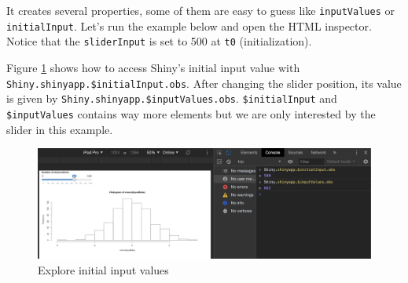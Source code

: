 \documentclass[]{book}
\newenvironment{Shaded}{\begin{snugshade}}{\end{snugshade}}
\newcommand{\ControlFlowTok}[1]{\textcolor[rgb]{0.13,0.29,0.53}{\textbf{#1}}}
\newcommand{\DataTypeTok}[1]{\textcolor[rgb]{0.13,0.29,0.53}{#1}}
\newcommand{\DecValTok}[1]{\textcolor[rgb]{0.00,0.00,0.81}{#1}}
\newcommand{\KeywordTok}[1]{\textcolor[rgb]{0.13,0.29,0.53}{\textbf{#1}}}
\newcommand{\NormalTok}[1]{#1}
\newcommand{\OperatorTok}[1]{\textcolor[rgb]{0.81,0.36,0.00}{\textbf{#1}}}
\newcommand{\StringTok}[1]{\textcolor[rgb]{0.31,0.60,0.02}{#1}}
\begin{document}
It creates several properties, some of them are easy to guess like \texttt{inputValues} or \texttt{initialInput}. Let's run the example below and open the HTML inspector. Notice that the \texttt{sliderInput} is set to 500 at \texttt{t0} (initialization).

\begin{Shaded}
\end{Shaded}

Figure \ref{fig:shiny-initial-inputs} shows how to access Shiny's initial input value with \texttt{Shiny.shinyapp.\$initialInput.obs}. After changing the slider position, its value is given by \texttt{Shiny.shinyapp.\$inputValues.obs}. \texttt{\$initialInput} and \texttt{\$inputValues} contains way more elements but we are only interested by the slider in this example.

\begin{figure}
\includegraphics[width=27.61in]{images/survival-kit/shiny-init-input} \caption{Explore initial input values}\label{fig:shiny-initial-inputs}
\end{figure}
\end{document}

